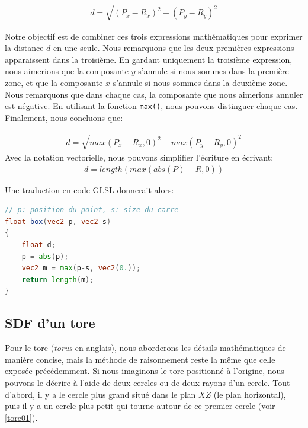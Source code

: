 \begin{align*} 
d = \sqrt{(P_x-R_x)^2 + (P_y-R_y)^2}
\end{align*}

Notre objectif est de combiner ces trois expressions mathématiques pour exprimer la distance $d$ en une seule. Nous remarquons que les deux premières expressions apparaissent dans la troisième. En gardant uniquement la troisième expression, nous aimerions que la composante $y$ s'annule si nous sommes dans la première zone, et que la composante $x$ s'annule si nous sommes dans la deuxième zone. Nous remarquons que dans chaque cas, la composante que nous aimerions annuler est négative. En utilisant la fonction \lstinline{max()}, nous pouvons distinguer chaque cas. Finalement, nous concluons que:

\begin{align*} 
d = \sqrt{max(P_x-R_x,0)^2 + max(P_y-R_y,0)^2}
\end{align*}
Avec la notation vectorielle, nous pouvons simplifier l'écriture en écrivant: 
\begin{align*} 
d = length(max(abs(P)-R, 0))
\end{align*}

\noindent
Une traduction en code GLSL donnerait alors:

\begin{minipage}{\linewidth}
\begin{lstlisting}[language=GLSL, caption=SDF d'un carré,captionpos=b,frame=single]
// p: position du point, s: size du carre
float box(vec2 p, vec2 s)
{
    float d;
    p = abs(p);
    vec2 m = max(p-s, vec2(0.));
    return length(m);
}
\end{lstlisting}
\end{minipage}


\subsection*{SDF d'un tore}

Pour le tore (\textit{torus} en anglais), nous aborderons les détails mathématiques de manière concise, mais la méthode de raisonnement reste la même que celle exposée précédemment. Si nous imaginons le tore positionné à l'origine, nous pouvons le décrire à l'aide de deux cercles ou de deux rayons d'un cercle. Tout d'abord, il y a le cercle plus grand situé dans le plan $XZ$ (le plan horizontal), puis il y a un cercle plus petit qui tourne autour de ce premier cercle (voir \ref{tore01}).

